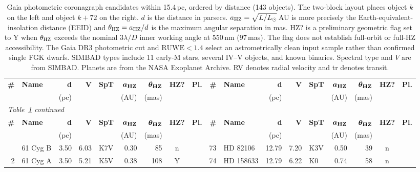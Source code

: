 \begin{landscape}
\footnotesize
\setlength{\tabcolsep}{3.6pt}
\begin{longtable}{r l r r l r r c l @{\;\vrule\;} r l r r l r r c l}
\caption{Gaia photometric coronagraph candidates within 15.4\,pc, ordered by distance (143 objects). The two-block layout places object $k$ on the left and object $k+72$ on the right. $d$ is the distance in parsecs. $a_{\rm HZ}=\sqrt{L/L_\odot}$\,AU is more precisely the Earth-equivalent-insolation distance (EEID) and $\theta_{\rm HZ}=a_{\rm HZ}/d$ is the maximum angular separation in mas. HZ? is a preliminary geometric flag set to Y when $\theta_{\rm HZ}$ exceeds the nominal $3\lambda/D$ inner working angle at 550\,nm ($97$\,mas). The flag does not establish full-orbit or full-HZ accessibility. The Gaia DR3 photometric cut and $\mathrm{RUWE}<1.4$ select an astrometrically clean input sample rather than confirmed single FGK dwarfs. SIMBAD types include 11 early-M stars, several IV--V objects, and known binaries. Spectral type and $V$ are from SIMBAD. Planets are from the NASA Exoplanet Archive. RV denotes radial velocity and tr denotes transit.}\label{tab:catalog}\\
\toprule
\textbf{\#} & \textbf{Name} & \textbf{d} & \textbf{V} & \textbf{SpT} & $\boldsymbol{a_{\rm HZ}}$ & $\boldsymbol{\theta_{\rm HZ}}$ & \textbf{HZ?} & \textbf{Pl.} & \textbf{\#} & \textbf{Name} & \textbf{d} & \textbf{V} & \textbf{SpT} & $\boldsymbol{a_{\rm HZ}}$ & $\boldsymbol{\theta_{\rm HZ}}$ & \textbf{HZ?} & \textbf{Pl.} \\
 & & (pc) & & & (AU) & (mas) & &  &  & & (pc) & & & (AU) & (mas) & &  \\
\midrule
\endfirsthead
\multicolumn{18}{l}{\footnotesize\itshape Table~\ref{tab:catalog} continued}\\
\toprule
\textbf{\#} & \textbf{Name} & \textbf{d} & \textbf{V} & \textbf{SpT} & $\boldsymbol{a_{\rm HZ}}$ & $\boldsymbol{\theta_{\rm HZ}}$ & \textbf{HZ?} & \textbf{Pl.} & \textbf{\#} & \textbf{Name} & \textbf{d} & \textbf{V} & \textbf{SpT} & $\boldsymbol{a_{\rm HZ}}$ & $\boldsymbol{\theta_{\rm HZ}}$ & \textbf{HZ?} & \textbf{Pl.} \\
 & & (pc) & & & (AU) & (mas) & &  &  & & (pc) & & & (AU) & (mas) & &  \\
\midrule
\endhead
\bottomrule
\endfoot
1 & 61 Cyg B & 3.50 & 6.03 & K7V & 0.30 & 85 & n &  & 73 & HD 82106 & 12.79 & 7.20 & K3V & 0.50 & 39 & n &  \\
2 & 61 Cyg A & 3.50 & 5.21 & K5V & 0.38 & 108 & Y &  & 74 & HD 158633 & 12.79 & 6.22 & K0 & 0.74 & 58 & n &  \\

\end{longtable}
\end{landscape}
